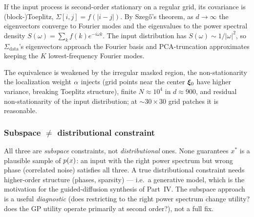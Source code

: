 \begin{proposition}
\label{prop:szego}
If the input process is second-order stationary on a regular grid, its covariance
is (block-)Toeplitz, $\Sigma[i,j]=f(|i-j|)$. By Szeg\H{o}'s theorem, as $d\to\infty$
the eigenvectors converge to Fourier modes and the eigenvalues to the power
spectral density $S(\omega)=\sum_k f(k)e^{-i\omega k}$. The input distribution has
$S(\omega)\sim1/|\omega|^2$, so $\Sigma_{\mathrm{data}}$'s eigenvectors approach
the Fourier basis and PCA-truncation approximates keeping the $K$
lowest-frequency Fourier modes.
\end{proposition}
The equivalence is weakened by the irregular masked region, the non-stationarity
the localization weight $\alpha$ injects (grid points near the center $\bm{\xi}_{0}$ have
higher variance, breaking Toeplitz structure), finite $N\approx10^4$ in
$d\approx900$, and residual non-stationarity of the input distribution; at
$\sim30\times30$ grid patches it is reasonable.

\subsubsection{Subspace $\ne$ distributional constraint}
All three are \emph{subspace} constraints, not \emph{distributional} ones. None
guarantees $x^*$ is a plausible sample of $p(x)$: an input with the right power
spectrum but wrong phase (correlated noise) satisfies all three. A true
distributional constraint needs higher-order structure (phases, sparsity)
--- i.e.\ a generative model, which is the motivation for the guided-diffusion
synthesis of Part~IV. The subspace approach is a useful \emph{diagnostic} (does
restricting to the right power spectrum change utility? does the GP utility
operate primarily at second order?), not a full fix.


